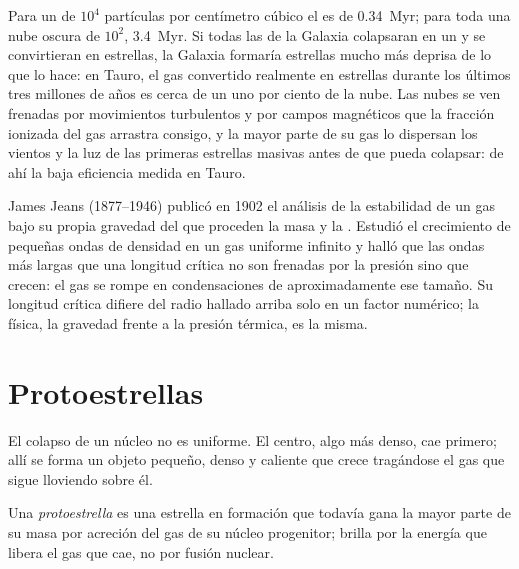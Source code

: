 Para un  de $10^4$ partículas por centímetro cúbico el 
es de \qty{0.34}{Myr}; para toda una nube oscura de $10^2$, \qty{3.4}{Myr}. Si todas
las  de la Galaxia colapsaran en un  y se convirtieran en
estrellas, la Galaxia formaría estrellas mucho más deprisa de lo que lo hace: en Tauro, el gas convertido realmente
en estrellas durante los últimos tres millones de años es cerca de un uno por ciento de la nube. Las
nubes se ven frenadas por movimientos turbulentos y por campos magnéticos que la
fracción ionizada del gas arrastra consigo, y la mayor parte de su gas lo dispersan
los vientos y la luz de las primeras estrellas masivas antes de que pueda colapsar: de ahí
la baja eficiencia medida en Tauro.

\begin{history}
James Jeans (1877--1946) publicó en 1902 el análisis de la estabilidad de un
gas bajo su propia gravedad del que proceden la masa y la .
Estudió el crecimiento de pequeñas ondas de densidad en un gas uniforme infinito y
halló que las ondas más largas que una longitud crítica no son frenadas por la presión
sino que crecen: el gas se rompe en condensaciones de aproximadamente ese tamaño. Su longitud
crítica difiere del radio hallado arriba solo en un factor numérico; la
física, la gravedad frente a la presión térmica, es la misma.
\end{history}

\section{Protoestrellas}

El colapso de un núcleo no es uniforme. El centro, algo más denso, cae
primero; allí se forma un objeto pequeño, denso y caliente que crece tragándose el gas
que sigue lloviendo sobre él.

\begin{definition}[Protoestrella]\label{def:b2:ism-star-formation:protostar}
Una \emph{protoestrella} es una estrella en formación que todavía
gana la mayor parte de su masa por acreción del gas de su núcleo progenitor;
brilla por la energía que libera el gas que cae, no por fusión nuclear.
\end{definition}

